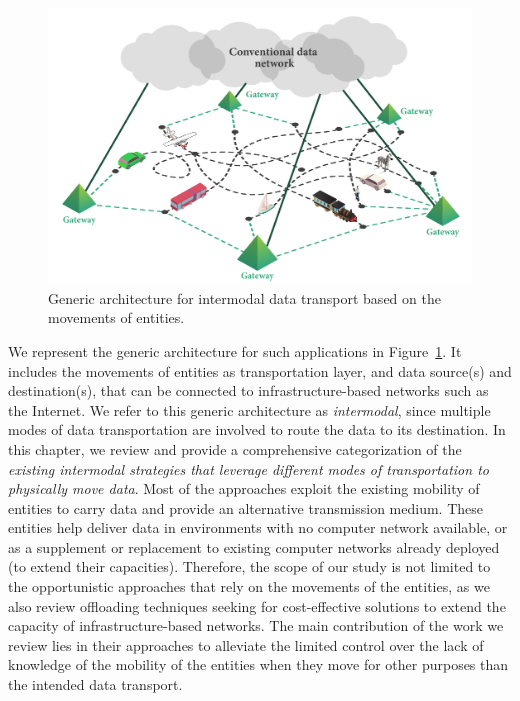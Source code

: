 \begin{figure}
    \centering
    \includegraphics[width=\textwidth]{figures/related-workv2.pdf}
    \caption{Generic architecture for intermodal data transport based on the movements of entities.}
    \label{fig:related-work}
\end{figure}

We represent the generic architecture for such applications in Figure~\ref{fig:related-work}. It includes the movements of entities as transportation layer, and data source(s) and destination(s), that can be connected to infrastructure-based networks such as the Internet. We refer to this generic architecture as \textit{intermodal}, since multiple modes of data transportation are involved to route the data to its destination. In this chapter, we review and provide a comprehensive categorization of the \textit{existing intermodal strategies that leverage different modes of transportation to physically move data}. Most of the approaches exploit the existing mobility of entities to carry data and provide an alternative transmission medium. These entities help deliver data in environments with no computer network available, or as a supplement or replacement to existing computer networks already deployed (\eg to extend their capacities). Therefore, the scope of our study is not limited to the opportunistic approaches that rely on the movements of the entities, as we also review offloading techniques seeking for cost-effective solutions to extend the capacity of infrastructure-based networks. The main contribution of the work we review lies in their approaches to alleviate the limited control over the lack of knowledge of the mobility of the entities when they move for other purposes than the intended data transport. 

